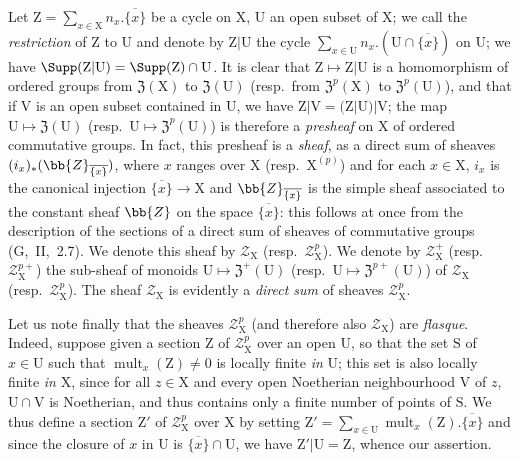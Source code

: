 \begin{env}[21.6.3]
\label{IV.21.6.3}
Let $\mathrm{Z}=\sum_{x\in\mathrm{X}}n_x.\overline{\{x\}}$ be a cycle on $\mathrm{X}$, $\mathrm{U}$ an open subset of $\mathrm{X}$;
we call the \emph{restriction} of $\mathrm{Z}$ to $\mathrm{U}$ and denote by $\mathrm{Z}|\mathrm{U}$ the cycle $\sum_{x\in\mathrm{U}}n_x.(\mathrm{U}\cap\overline{\{x\}})$ on $\mathrm{U}$;
we have $\Supp(\mathrm{Z}|\mathrm{U})=\Supp(\mathrm{Z})\cap\mathrm{U}$.
It is clear that $\mathrm{Z}\mapsto\mathrm{Z}|\mathrm{U}$ is a homomorphism of ordered groups from $\mathfrak{Z}(\mathrm{X})$ to $\mathfrak{Z}(\mathrm{U})$ (resp.\ from $\mathfrak{Z}^p(\mathrm{X})$ to $\mathfrak{Z}^p(\mathrm{U})$), and that if $\mathrm{V}$ is an open subset contained in $\mathrm{U}$, we have $\mathrm{Z}|\mathrm{V}=(\mathrm{Z}|\mathrm{U})|\mathrm{V}$;
the map $\mathrm{U}\mapsto\mathfrak{Z}(\mathrm{U})$ (resp.\ $\mathrm{U}\mapsto\mathfrak{Z}^{p}(\mathrm{U})$) is therefore a \emph{presheaf} on $\mathrm{X}$ of ordered commutative groups.
In fact, this presheaf is a \emph{sheaf}, as a direct sum of sheaves $(i_x)_*(\bb{Z}_{\overline{\{x\}}})$, where $x$ ranges over $\mathrm{X}$ (resp.\ $\mathrm{X}^{(p)}$) and for each $x\in\mathrm{X}$, $i_x$ is the canonical injection $\overline{\{x\}}\to\mathrm{X}$ and $\bb{Z}_{\overline{\{x\}}}$ is the simple sheaf associated to the constant sheaf $\bb{Z}$ on the space $\overline{\{x\}}$:
this follows at once from the description of the sections of a direct sum of sheaves of commutative groups (G,~II,~2.7).
We denote this sheaf by $\mathscr{Z}_\mathrm{X}$ (resp.\ $\mathscr{Z}_\mathrm{X}^p$).
We denote by $\mathscr{Z}_\mathrm{X}^+$ (resp.\ $\mathscr{Z}_\mathrm{X}^{p+}$) the sub-sheaf
of monoids $\mathrm{U}\mapsto\mathfrak{Z}^+(\mathrm{U})$ (resp.\ $\mathrm{U}\mapsto\mathfrak{Z}^{p+}(\mathrm{U})$) of $\mathscr{Z}_\mathrm{X}$ (resp.\ $\mathscr{Z}_\mathrm{X}^p$).
The sheaf $\mathscr{Z}_\mathrm{X}$ is evidently a \emph{direct sum} of sheaves $\mathscr{Z}_\mathrm{X}^p$.

Let us note finally that the sheaves $\mathscr{Z}_\mathrm{X}^p$ (and therefore also $\mathscr{Z}_\mathrm{X}$) are \emph{flasque}.
Indeed, suppose given a section $\mathrm{Z}$ of $\mathscr{Z}_\mathrm{X}^p$ over an open $\mathrm{U}$, so that the set $\mathrm{S}$ of $x\in\mathrm{U}$ such that $\operatorname{mult}_x(\mathrm{Z})\neq 0$ is locally finite \emph{in} $\mathrm{U}$;
this set is also locally finite \emph{in} $\mathrm{X}$, since for all $z\in\mathrm{X}$ and every open Noetherian neighbourhood $\mathrm{V}$ of $z$, $\mathrm{U}\cap\mathrm{V}$ is Noetherian, and thus contains only a finite number of points of $\mathrm{S}$.
We thus define a section $\mathrm{Z}'$ of $\mathscr{Z}_\mathrm{X}^p$ over $\mathrm{X}$ by setting $\mathrm{Z}'=\sum_{x\in\mathrm{U}}\operatorname{mult}_x(\mathrm{Z}).\overline{\{x\}}$ and since the closure of $x$ in $\mathrm{U}$ is $\overline{\{x\}}\cap\mathrm{U}$, we have $\mathrm{Z}'|\mathrm{U}=\mathrm{Z}$, whence our assertion.
\end{env}

